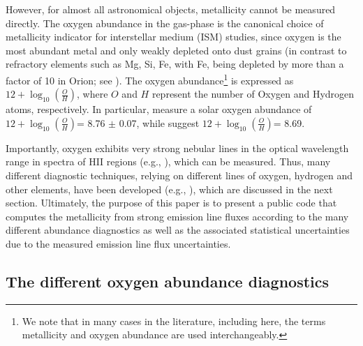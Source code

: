 \documentclass{emulateapj}
\newcommand{\oxab}{\ensuremath{12 + \log_{10}(\frac{O}{H})}}
\begin{document}
However, for almost all astronomical objects, metallicity cannot be measured directly. The oxygen abundance in the gas-phase is the canonical choice of metallicity indicator for interstellar medium (ISM) studies, since oxygen is the most abundant metal and only weakly depleted onto dust grains (in contrast to refractory elements such as Mg, Si, Fe, with Fe, being depleted by more than a factor of 10 in Orion; see \citealt{simondiaz11-orion}). The oxygen abundance\footnote{We note that in many cases in the literature, including here, the terms metallicity and oxygen abundance are used interchangeably.} is expressed as  \oxab, where $O$ and $H$ represent the number of Oxygen and Hydrogen atoms, respectively. In particular, \citealt{chaffau11} measure a solar oxygen abundance of \oxab = 8.76 $\pm$ 0.07, while \citet{asplund09_rev} suggest \oxab = 8.69.

Importantly, oxygen exhibits very strong nebular lines in the optical wavelength range in spectra of HII regions (e.g., \citealt{pagel79,osterbrock89,tremonti04}), which can be measured. Thus, many different diagnostic techniques, relying on different lines of oxygen, hydrogen and other elements, have been developed (e.g., \citealt{kewley02,pettini04,kobulnicky04,kewley08}), which are discussed in the next section. Ultimately, the purpose of this paper is to present a public code that computes the metallicity from strong emission line fluxes according to the many different abundance diagnostics as well as the associated statistical uncertainties due to the measured emission line flux uncertainties.

\subsection{The different oxygen abundance diagnostics}
\end{document}
